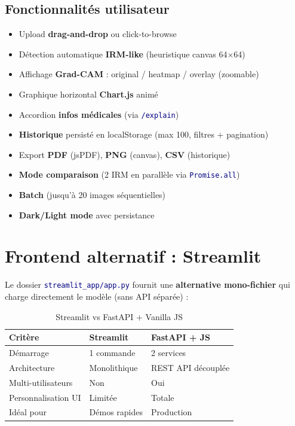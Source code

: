 \documentclass[11pt,a4paper,oneside]{report}
\newcommand{\code}[1]{\texttt{\textcolor{navy}{#1}}}
\newcommand{\rt}[1]{\textcolor{accentred}{#1}}
\newcommand{\gn}[1]{\textcolor{accentgreen}{#1}}
\begin{document}
\subsection{Fonctionnalités utilisateur}

\begin{itemize}
\item Upload \textbf{drag-and-drop} ou click-to-browse
\item Détection automatique \textbf{IRM-like} (heuristique canvas 64$\times$64)
\item Affichage \textbf{Grad-CAM} : original / heatmap / overlay (zoomable)
\item Graphique horizontal \textbf{Chart.js} animé
\item Accordion \textbf{infos médicales} (via \code{/explain})
\item \textbf{Historique} persisté en localStorage (max 100, filtres + pagination)
\item Export \textbf{PDF} (jsPDF), \textbf{PNG} (canvas), \textbf{CSV} (historique)
\item \textbf{Mode comparaison} (2 IRM en parallèle via \code{Promise.all})
\item \textbf{Batch} (jusqu'à 20 images séquentielles)
\item \textbf{Dark/Light mode} avec persistance
\end{itemize}

\section{Frontend alternatif : Streamlit}

Le dossier \code{streamlit\_app/app.py} fournit une \textbf{alternative mono-fichier} qui charge directement le modèle (sans API séparée) :

\begin{table}[!htbp]
\centering
\caption{Streamlit vs FastAPI + Vanilla JS}
\begin{tabularx}{\textwidth}{|l|X|X|}
\hline
\textbf{Critère} & \textbf{Streamlit} & \textbf{FastAPI + JS} \\
\hline
Démarrage & 1 commande & 2 services \\
Architecture & Monolithique & REST API découplée \\
Multi-utilisateurs & \rt{Non} & \gn{Oui} \\
Personnalisation UI & Limitée & Totale \\
Idéal pour & Démos rapides & Production \\
\hline
\end{tabularx}
\end{table}
\end{document}
